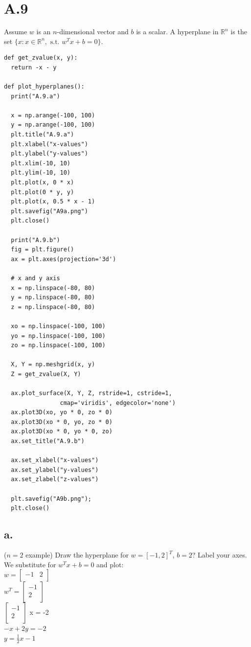 \documentclass{article}
\newcommand{\field}[1]{\mathbb{#1}}
\newcommand{\1}{\mathbf{1}}
\newcommand{\R}{\field{R}} %
\begin{document}
\section*{A.9}
{\Large 

Assume $w$ is an $n$-dimensional vector and $b$ is a scalar. A hyperplane in $\R^n$ is the set $\{x : x\in \R^n,\text{ s.t. } w^T x + b = 0\}$.

\begin{verbatim}
def get_zvalue(x, y):
  return -x - y

def plot_hyperplanes():
  print("A.9.a")

  x = np.arange(-100, 100)
  y = np.arange(-100, 100)
  plt.title("A.9.a")
  plt.xlabel("x-values")
  plt.ylabel("y-values")
  plt.xlim(-10, 10)
  plt.ylim(-10, 10)
  plt.plot(x, 0 * x)
  plt.plot(0 * y, y)
  plt.plot(x, 0.5 * x - 1)
  plt.savefig("A9a.png")
  plt.close()

  print("A.9.b")
  fig = plt.figure()
  ax = plt.axes(projection='3d')

  # x and y axis
  x = np.linspace(-80, 80)
  y = np.linspace(-80, 80)
  z = np.linspace(-80, 80)

  xo = np.linspace(-100, 100)
  yo = np.linspace(-100, 100)
  zo = np.linspace(-100, 100)
  
  X, Y = np.meshgrid(x, y)
  Z = get_zvalue(X, Y)
  
  ax.plot_surface(X, Y, Z, rstride=1, cstride=1,
                cmap='viridis', edgecolor='none')
  ax.plot3D(xo, yo * 0, zo * 0)
  ax.plot3D(xo * 0, yo, zo * 0)
  ax.plot3D(xo * 0, yo * 0, zo)
  ax.set_title("A.9.b")
  
  ax.set_xlabel("x-values")
  ax.set_ylabel("y-values")
  ax.set_zlabel("z-values")
  
  plt.savefig("A9b.png");
  plt.close()
\end{verbatim}

\subsection*{a.}
($n=2$ example) Draw the hyperplane for $w=[-1,2]^T$, $b=2$? Label your axes. \\ 
We substitute for $w^T x + b = 0$ and plot: \\
$w = \begin{bmatrix} -1 & 2 \\ \end{bmatrix}$ \\
$w^T = \begin{bmatrix} -1 \\ 2 \\ \end{bmatrix}$ \\
$\begin{bmatrix} -1 \\ 2 \\ \end{bmatrix}$ x = -2 \\
$-x + 2y = -2$ \\
$y = \frac{1}{2}x -1$ \\

}
\end{document}
